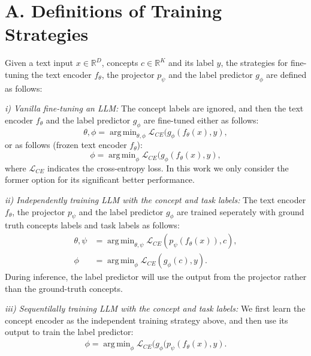\documentclass[letterpaper]{article} %
\DeclareMathOperator*{\argmin}{arg\,min}
\begin{document}

\newpage
\section{A. Definitions of Training Strategies}
\label{app:def}

Given a text input $x \in \mathbb{R}^D$, concepts $c\in \mathbb{R}^K$ and its label $y$, the strategies for fine-tuning the text encoder $f_\theta$, the projector $p_\psi$ and the label predictor $g_\phi$ are defined as follows:

\noindent\textit{i) Vanilla fine-tuning an LLM:} The concept labels are ignored, and then the text encoder $f_\theta$ and the label predictor $g_\phi$ are fine-tuned either as follows:
\begin{equation*}
    \theta, \phi = \argmin_{\theta, \phi} \mathcal{L}_{CE} (g_\phi(f_\theta(x), y),
\end{equation*}
or as follows (frozen text encoder $f_\theta$):
\begin{equation*}
    \phi = \argmin_{\phi} \mathcal{L}_{CE} (g_\phi(f_\theta(x), y),
\end{equation*}
where $\mathcal{L}_{CE}$ indicates the cross-entropy loss. In this work we only consider the former option for its significant better performance.

\noindent\textit{ii) Independently training LLM with the concept and task labels:} The text encoder $f_\theta$, the projector $p_\psi$ and the label predictor $g_\phi$ are trained seperately with ground truth concepts labels and task labels as follows:
\begin{equation*}
    \begin{aligned}
    \theta, \psi &= \argmin_{\theta, \psi} \mathcal{L}_{CE} (p_\psi(f_\theta(x)),c), \\
    \phi &= \argmin_{\phi} \mathcal{L}_{CE} (g_{\phi}(c),y).
    \end{aligned}
\end{equation*} 
During inference, the label predictor will use the output from the projector rather than the ground-truth concepts.


\noindent\textit{iii) Sequentilally training LLM with the concept and task labels:} We first learn the concept encoder as the independent training strategy above, and then use its output to train the label predictor:
\begin{equation*}
    \begin{aligned}
    \phi = \argmin_{\phi} \mathcal{L}_{CE} (g_{\phi}(p_\psi(f_\theta(x),y).
    \end{aligned}
\end{equation*} 
\end{document}
